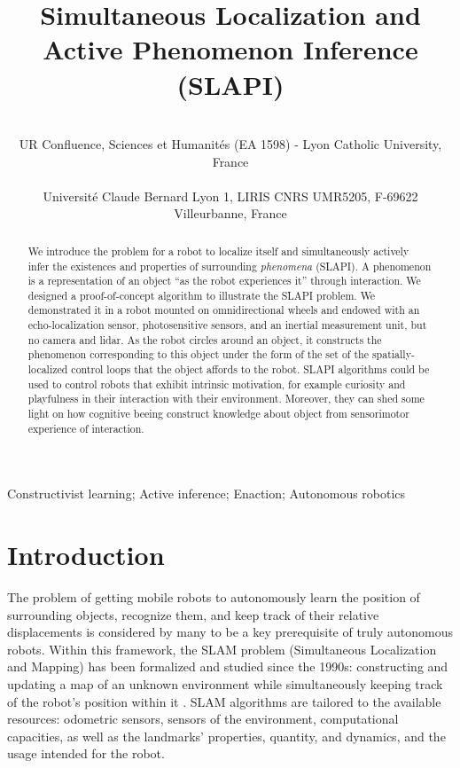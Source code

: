 \documentclass[pmlr]{jmlr}%
\title[SLAPI]{Simultaneous Localization and Active Phenomenon Inference (SLAPI)}
\author{\Name{Olivier L. Georgeon} \Email{ogeorgeon@univ-catholyon.fr}\\
  \addr UR Confluence, Sciences et Humanités (EA 1598) - Lyon Catholic University, France\\
  \Name{Titouan Knockaert} \Email{titouan.knockaert@gmail.com}\\
  \addr Université Claude Bernard Lyon 1, LIRIS CNRS UMR5205, F-69622 Villeurbanne, France
}
\begin{document}
\maketitle

\begin{abstract}
We introduce the problem for a robot to  localize itself and simultaneously actively infer the existences and properties of surrounding \textit{phenomena} (SLAPI). 
A phenomenon is a representation of an object ``as the robot experiences it'' through interaction. 
We designed a proof-of-concept algorithm to illustrate the SLAPI problem. 
We demonstrated it in a robot mounted on omnidirectional wheels and endowed with an echo-localization sensor, photosensitive sensors, and an inertial measurement unit, but no camera and lidar. 
As the robot circles around an object, it constructs the phenomenon corresponding to this object under the form of the set of the spatially-localized control loops that the object affords to the robot. 
SLAPI algorithms could be used to control robots that exhibit intrinsic motivation, for example curiosity and playfulness in their interaction with their environment. Moreover, they can shed some light on how cognitive beeing construct knowledge about object from sensorimotor experience of interaction.
\end{abstract}

\begin{keywords}
Constructivist learning; Active inference; Enaction; Autonomous robotics
\end{keywords}

\section{Introduction}
\label{sec:intro}

The problem of getting mobile robots to autonomously learn the position of surrounding objects, recognize them, and keep track of their relative displacements is considered by many to be a key prerequisite of truly autonomous robots. 
Within this framework, the SLAM problem (Simultaneous Localization and Mapping) has been formalized and studied since the 1990s: constructing and updating a map of an unknown environment while simultaneously keeping track of the robot's position within it \citep[e.g.,][]{taketomi_visual_2017}.
SLAM algorithms are tailored to the available resources: odometric sensors, sensors of the environment, computational capacities, as well as the landmarks' properties, quantity, and dynamics, and the usage intended for the robot.
\end{document}
